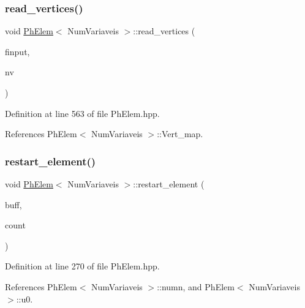 \mbox{\label{classPhElem_a8abc7be8120f4192de31e0cfb32ac968}} 
\subsubsection{\texorpdfstring{read\+\_\+vertices()}{read\_vertices()}}
{\footnotesize\ttfamily void \hyperlink{classPhElem}{Ph\+Elem}$<$ Num\+Variaveis $>$\+::read\+\_\+vertices (\begin{DoxyParamCaption}\item[{F\+I\+LE $\ast$}]{finput,  }\item[{const int \&}]{nv }\end{DoxyParamCaption})\hspace{0.3cm}{\ttfamily [inherited]}}



Definition at line 563 of file Ph\+Elem.\+hpp.



References Ph\+Elem$<$ Num\+Variaveis $>$\+::\+Vert\+\_\+map.

\mbox{\label{classPhElem_abe273d496e748985021a8f67ef598c0d}} 
\subsubsection{\texorpdfstring{restart\+\_\+element()}{restart\_element()}}
{\footnotesize\ttfamily void \hyperlink{classPhElem}{Ph\+Elem}$<$ Num\+Variaveis $>$\+::restart\+\_\+element (\begin{DoxyParamCaption}\item[{double $\ast$}]{buff,  }\item[{int \&}]{count }\end{DoxyParamCaption})\hspace{0.3cm}{\ttfamily [inherited]}}



Definition at line 270 of file Ph\+Elem.\+hpp.



References Ph\+Elem$<$ Num\+Variaveis $>$\+::numn, and Ph\+Elem$<$ Num\+Variaveis $>$\+::u0.

